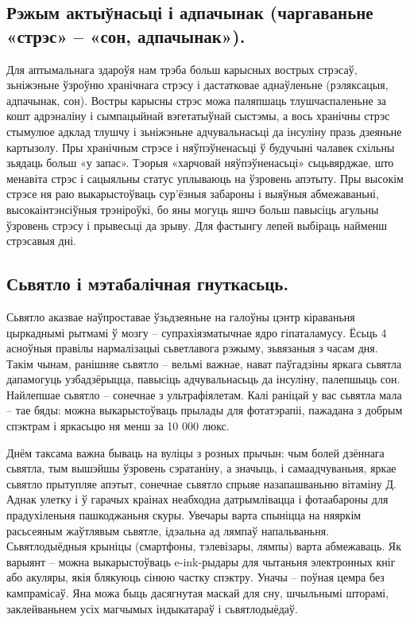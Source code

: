 \subsection{Рэжым актыўнасьці і адпачынак (чаргаваньне «стрэс» – «сон, адпачынак»).}
Для аптымальнага здароўя нам трэба больш карысных вострых стрэсаў, зьніжэньне ўзроўню хранічнага стрэсу і дастатковае аднаўленьне (рэляксацыя, адпачынак, сон). Востры карысны стрэс можа паляпшаць тлушчаспаленьне за кошт адрэналіну і сымпацыйнай вэгетатыўнай сыстэмы, а вось хранічны стрэс стымулюе адклад тлушчу і зьніжэньне адчувальнасьці да інсуліну празь дзеяньне картызолу. Пры хранічным стрэсе і няўпэўненасьці ў будучыні чалавек схільны зьядаць больш «у запас». Тэорыя «харчовай няўпэўненасьці» сьцьвярджае, што менавіта стрэс і сацыяльны статус уплываюць на ўзровень апэтыту. Пры высокім стрэсе ня раю выкарыстоўваць сур'ёзныя забароны і выяўныя абмежаваньні, высокаінтэнсіўныя трэніроўкі, бо яны могуць яшчэ больш павысіць агульны ўзровень стрэсу і прывесьці да зрыву. Для фастынгу лепей выбіраць найменш стрэсавыя дні.

\subsection{Сьвятло і мэтабалічная гнуткасьць.}
Сьвятло аказвае наўпроставае ўзьдзеяньне на галоўны цэнтр кіраваньня цыркаднымі рытмамі ў мозгу – супрахіязматычнае ядро гіпаталамусу. Ёсьць 4 асноўныя правілы нармалізацыі сьветлавога рэжыму, зьвязаныя з часам дня. Такім чынам, ранішняе сьвятло – вельмі важнае, нават паўгадзіны яркага сьвятла дапамогуць узбадзёрыцца, павысіць адчувальнасьць да інсуліну, палепшыць сон. Найлепшае сьвятло – сонечнае з ультрафіялетам. Калі раніцай у вас сьвятла мала – тае бяды: можна выкарыстоўваць прылады для фотатэрапіі, пажадана з добрым спэктрам і яркасьцю ня менш за 10 000 люкс.

Днём таксама важна бываць на вуліцы з розных прычын: чым болей дзённага сьвятла, тым вышэйшы ўзровень сэратаніну, а значыць, і самаадчуваньня, яркае сьвятло прытупляе апэтыт, сонечнае сьвятло спрыяе назапашваньню вітаміну Д. Аднак улетку і ў гарачых краінах неабходна датрымлівацца і фотаабароны для прадухіленьня пашкоджаньня скуры. Увечары варта спыніцца на няяркім расьсеяным жаўтлявым сьвятле, ідэальна ад лямпаў напальваньня. Сьвятлодыёдныя крыніцы (смартфоны, тэлевізары, лямпы) варта абмежаваць. Як варыянт – можна выкарыстоўваць e-ink-рыдары для чытаньня электронных кніг або акуляры, якія блякуюць сінюю частку спэктру. Уначы – поўная цемра без кампрамісаў. Яна можа быць дасягнутая маскай для сну, шчыльнымі шторамі, заклейваньнем усіх магчымых індыкатараў і сьвятлодыёдаў.

